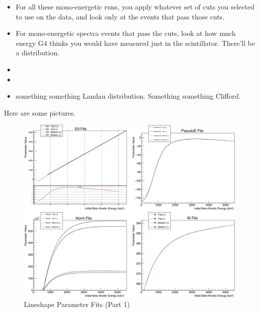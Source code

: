 \begin{itemize}
\begin{itemize}
		\item For all these mono-energetic runs, you apply whatever set of cuts you selected to use on the data, and look only at the events that pass those cuts.  
		\item For mono-energetic spectra events that pass the cuts, look at how much energy G4 thinks you would have measured just in the scintillator.  There'll be a distribution.  
		\item {}
		\item {}
		\item something something Landau distribution.  Something something Clifford.~\cite{clifford}
	\end{itemize}
\end{itemize}

Here are some pictures.


\begin{figure}[h!!tb]
	\centering
	\includegraphics[width=.999\linewidth]
	{Figures/LineshapeParams_part1.png}
	\caption[Lineshape Parameter Fits (Part 1)]{Lineshape Parameter Fits (Part 1)}	
\end{figure}

